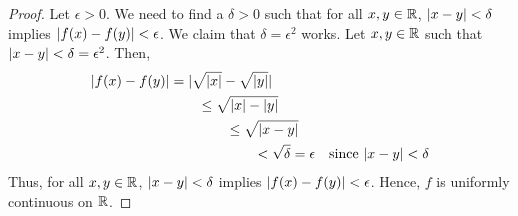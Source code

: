 \begin{problem}
\begin{enumroman}
\begin{answer}
\begin{claim}
\begin{proof}
            Let $\epsilon > 0$.
            We need to find a $\delta > 0$ such that for all $x, y \in \mathbb{R}$,
            $\lvert x - y\rvert < \delta$ implies $\lvert f(x) - f(y)\rvert < \epsilon$.
            We claim that $\delta = \epsilon^2$ works.
            Let $x, y \in \mathbb{R}$ such that $\lvert x - y\rvert < \delta = \epsilon^2$.
            Then,
            \begin{align*}
              \lvert f(x) - f(y)\rvert &= \lvert\sqrt{\lvert x\rvert} - \sqrt{\lvert y\rvert}\rvert \\
                &\qquad \leq \sqrt{\lvert x\rvert - \lvert y\rvert} \\
                &\qquad \qquad\leq \sqrt{\lvert x - y\rvert} \\
                &\qquad \qquad \qquad< \sqrt{\delta} = \epsilon &\text{since $\lvert x - y\rvert < \delta$}
            \end{align*}
            Thus, for all $x, y \in \mathbb{R}$, $\lvert x - y\rvert < \delta$ implies $\lvert f(x) - f(y)\rvert < \epsilon$.
            Hence, $f$ is uniformly continuous on $\mathbb{R}$.
          \end{proof}
        \end{claim}
      \end{answer}
  \end{enumroman}
\end{problem}
